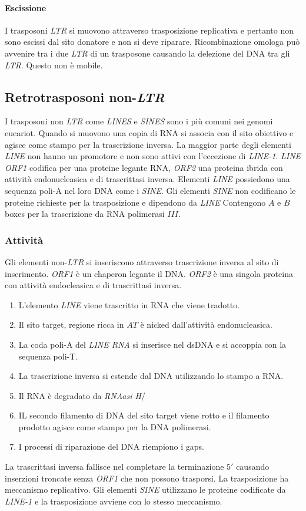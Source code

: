 			\paragraph{Escissione}
			I trasposoni \emph{LTR} si muovono attraverso trasposizione replicativa e pertanto non sono escissi dal sito donatore e non si deve riparare.
			Ricombinazione omologa pu\`o avvenire tra i due \emph{LTR} di un trasposone causando la delezione del DNA tra gli \emph{LTR}.
			Questo non \`e mobile.

	\subsection{Retrotrasposoni non-\emph{LTR}}
	I trasposoni non \emph{LTR} come \emph{LINES} e \emph{SINES} sono i pi\`u comuni nei genomi eucariot.
	Quando si muovono una copia di RNA si associa con il sito obiettivo e agisce come stampo per la trascrizione inversa.
	La maggior parte degli elementi \emph{LINE} non hanno un promotore e non sono attivi con l'eccezione di \emph{LINE-1}.
	\emph{LINE ORF1} codifica per una proteine legante RNA, \emph{ORF2} una proteina ibrida con attivit\`a endonucleasica e di trascrittasi inversa.
	Elementi \emph{LINE} possiedono una sequenza poli-A nel loro DNA come i \emph{SINE}.
	Gli elementi \emph{SINE} non codificano le proteine richieste per la trasposizione e dipendono da \emph{LINE}
	Contengono $A$ e $B$ boxes per la trascrizione da RNA polimerasi $III$.

		\subsubsection{Attivit\`a}
		Gli elementi non-\emph{LTR} si inseriscono attraverso trascrizione inversa al sito di inserimento.
		\emph{ORF1} \`e un chaperon legante il DNA.
		\emph{ORF2} \`e una singola proteina con attivit\`a endocleasica e di trascrittasi inversa.
		\begin{enumerate}
			\item L'elemento \emph{LINE} viene trascritto in RNA che viene tradotto.
			\item Il sito target, regione ricca in $AT$ \`e nicked dall'attivit\`a endonucleasica.
			\item La coda poli-A del \emph{LINE RNA} si inserisce nel dsDNA e si accoppia con la sequenza poli-T.
			\item La trascrizione inversa si estende dal DNA utilizzando lo stampo a RNA.
			\item Il RNA \`e degradato da \emph{RNAasi H}/
			\item IL secondo filamento di DNA del sito target viene rotto e il filamento prodotto agisce come stampo per la DNA polimerasi.
			\item I processi di riparazione del DNA riempiono i gaps.
		\end{enumerate}
		La trascrittasi inversa fallisce nel completare la terminazione $5'$ causando inserzioni troncate senza \emph{ORF1} che non possono trasporsi.
		La trasposizione ha meccanismo replicativo.
		Gli elementi \emph{SINE} utilizzano le proteine codificate da \emph{LINE-1} e la trasposizione avviene con lo stesso meccanismo.

